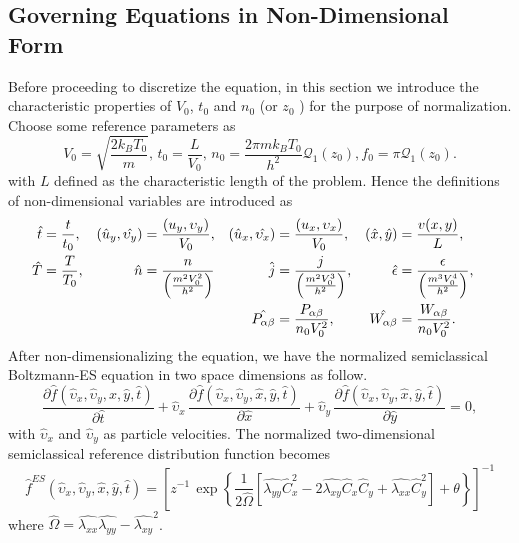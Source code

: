 \documentclass{rsproca}%
\begin{document}
\subsection{Governing Equations in Non-Dimensional Form}
\label{subsec:3_2}
Before proceeding to discretize the equation, in this section we introduce the characteristic properties of $V_0$, $t_0$ and $n_0$ (or $z_0$ ) for the purpose of normalization.  Choose some reference parameters as
\begin{equation}
V_0 = \sqrt{\frac{2k_B T_0}{m}}, \, t_0 = \frac{L}{V_0},\, n_{0} = \frac{2 \pi m k_B T_0}{h^2} \mathcal{Q}_1 (z_0), f_0=\pi \mathcal{Q}_1(z_0).
\end{equation}
with $L$ defined as the characteristic length of the problem. Hence the definitions of non-dimensional variables are introduced as
\begin{align}
\hat{t} &=\frac{t}{t_0},& (\hat{u}_y,\hat{\upsilon_y})&={(u_y,\upsilon_y)\over V_0},& 
(\hat{u}_x,\hat{\upsilon_x})&=\frac{(u_x,\upsilon_x)}{V_0},& (\hat{x},\hat{y})&=\frac{v(x, y)}{L},& \nonumber \\
\hat{T}&=\frac{T}{T_0},& \hat{n}&={n \over \left(\frac{m^2V_0^2}{h^2}\right)}& 
\hat{j}&={j \over \left(\frac{m^2V_{0}^3}{h^2}\right) },& \hat{\epsilon}&={\epsilon \over \left(\frac{m^3 V_{0}^4}{h^2}\right)},& \nonumber \\
& & & &\hat{P_{\alpha \beta}} &= { P_{\alpha \beta} \over n_{0} V_{0}^2 },& \hat{W_{\alpha \beta}} &= { W_{\alpha \beta} \over n_{0} V_0^2}.&
\end{align}
After non-dimensionalizing the equation, we have the normalized semiclassical Boltzmann-ES equation in two space dimensions as follow.
\begin{equation}
\frac{\partial\hat{f}(\hat{\upsilon}_x,\hat{\upsilon}_y,\hat{x},\hat{y},\hat{t})}{\partial\hat{t}} + \hat{\upsilon}_x\,\frac{\partial\hat{f}(\hat{\upsilon}_x,\hat{\upsilon}_y,\hat{x},\hat{y},\hat{t})}{\partial\hat{x}} + \hat{\upsilon}_y\,\frac{\partial\hat{f}(\hat{\upsilon}_x,\hat{\upsilon}_y,\hat{x},\hat{y},\hat{t})}{\partial\hat{y}} = 0, \label{normalizedes}
\end{equation}
with $\hat{\upsilon}_x$ and $\hat{\upsilon}_y$ as particle velocities. The normalized two-dimensional semiclassical reference distribution function becomes
\begin{equation}
\hat{f}^{ES}\left(\hat{\upsilon}_x,\hat{\upsilon}_y,\hat{x},\hat{y},\hat{t}\right) =
\left[ z^{-1}\,\exp\left\{ \frac{1}{2 \hat{\Omega}} \left[ \hat{\lambda_{yy}} \hat{C}_x^2 - 2 
\hat{\lambda_{xy}} \hat{C}_x \hat{C}_y + \hat{\lambda_{xx}} \hat{C}_y^2 \right] + \theta  \right\} \right]^{-1}
\end{equation}
where $\hat{\Omega} = \hat{\lambda_{xx}} \hat{ \lambda_{yy}} - \hat{\lambda_{xy}}^2$.
\end{document}
